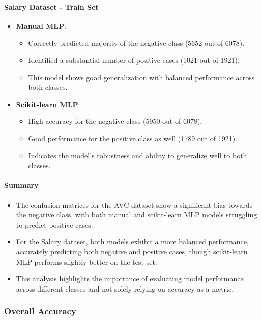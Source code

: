 \documentclass[a4paper,12pt]{article}
\begin{document}
\paragraph{Salary Dataset - Train Set}
\begin{itemize}
    \item \textbf{Manual MLP}:
    \begin{itemize}
        \item Correctly predicted majority of the negative class (5652 out of 6078).
        \item Identified a substantial number of positive cases (1021 out of 1921).
        \item This model shows good generalization with balanced performance across both classes.
    \end{itemize}
    \item \textbf{Scikit-learn MLP}:
    \begin{itemize}
        \item High accuracy for the negative class (5950 out of 6078).
        \item Good performance for the positive class as well (1789 out of 1921).
        \item Indicates the model's robustness and ability to generalize well to both classes.
    \end{itemize}
\end{itemize}

\paragraph{Summary}
\begin{itemize}
    \item The confusion matrices for the AVC dataset show a significant bias towards the negative class, with both manual and scikit-learn MLP models struggling to predict positive cases.
    \item For the Salary dataset, both models exhibit a more balanced performance, accurately predicting both negative and positive cases, though scikit-learn MLP performs slightly better on the test set.
    \item This analysis highlights the importance of evaluating model performance across different classes and not solely relying on accuracy as a metric.
\end{itemize}

\subsubsection{Overall Accuracy}
\end{document}
